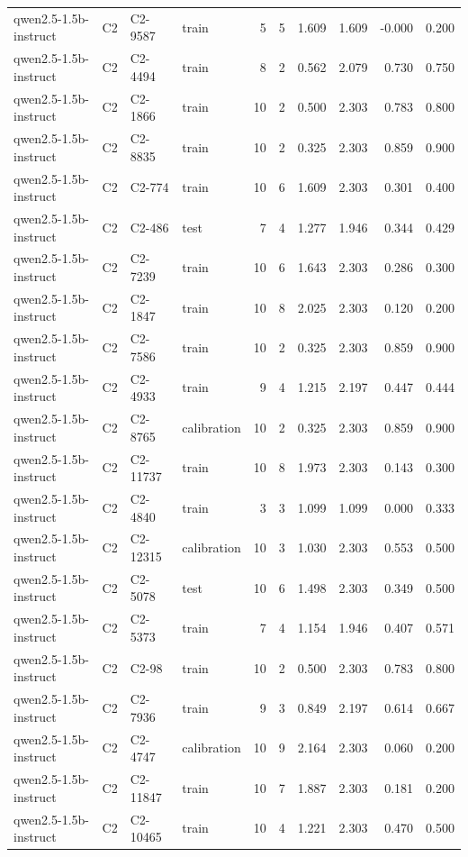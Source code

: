 \begin{table}
\begin{tabular}{llllrrrrrr}
qwen2.5-1.5b-instruct & C2 & C2-9587 & train & 5 & 5 & 1.609 & 1.609 & -0.000 & 0.200 \\
qwen2.5-1.5b-instruct & C2 & C2-4494 & train & 8 & 2 & 0.562 & 2.079 & 0.730 & 0.750 \\
qwen2.5-1.5b-instruct & C2 & C2-1866 & train & 10 & 2 & 0.500 & 2.303 & 0.783 & 0.800 \\
qwen2.5-1.5b-instruct & C2 & C2-8835 & train & 10 & 2 & 0.325 & 2.303 & 0.859 & 0.900 \\
qwen2.5-1.5b-instruct & C2 & C2-774 & train & 10 & 6 & 1.609 & 2.303 & 0.301 & 0.400 \\
qwen2.5-1.5b-instruct & C2 & C2-486 & test & 7 & 4 & 1.277 & 1.946 & 0.344 & 0.429 \\
qwen2.5-1.5b-instruct & C2 & C2-7239 & train & 10 & 6 & 1.643 & 2.303 & 0.286 & 0.300 \\
qwen2.5-1.5b-instruct & C2 & C2-1847 & train & 10 & 8 & 2.025 & 2.303 & 0.120 & 0.200 \\
qwen2.5-1.5b-instruct & C2 & C2-7586 & train & 10 & 2 & 0.325 & 2.303 & 0.859 & 0.900 \\
qwen2.5-1.5b-instruct & C2 & C2-4933 & train & 9 & 4 & 1.215 & 2.197 & 0.447 & 0.444 \\
qwen2.5-1.5b-instruct & C2 & C2-8765 & calibration & 10 & 2 & 0.325 & 2.303 & 0.859 & 0.900 \\
qwen2.5-1.5b-instruct & C2 & C2-11737 & train & 10 & 8 & 1.973 & 2.303 & 0.143 & 0.300 \\
qwen2.5-1.5b-instruct & C2 & C2-4840 & train & 3 & 3 & 1.099 & 1.099 & 0.000 & 0.333 \\
qwen2.5-1.5b-instruct & C2 & C2-12315 & calibration & 10 & 3 & 1.030 & 2.303 & 0.553 & 0.500 \\
qwen2.5-1.5b-instruct & C2 & C2-5078 & test & 10 & 6 & 1.498 & 2.303 & 0.349 & 0.500 \\
qwen2.5-1.5b-instruct & C2 & C2-5373 & train & 7 & 4 & 1.154 & 1.946 & 0.407 & 0.571 \\
qwen2.5-1.5b-instruct & C2 & C2-98 & train & 10 & 2 & 0.500 & 2.303 & 0.783 & 0.800 \\
qwen2.5-1.5b-instruct & C2 & C2-7936 & train & 9 & 3 & 0.849 & 2.197 & 0.614 & 0.667 \\
qwen2.5-1.5b-instruct & C2 & C2-4747 & calibration & 10 & 9 & 2.164 & 2.303 & 0.060 & 0.200 \\
qwen2.5-1.5b-instruct & C2 & C2-11847 & train & 10 & 7 & 1.887 & 2.303 & 0.181 & 0.200 \\
qwen2.5-1.5b-instruct & C2 & C2-10465 & train & 10 & 4 & 1.221 & 2.303 & 0.470 & 0.500 \\

\end{tabular}
\end{table}
